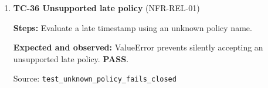 \begin{enumerate}
\begin{minipage}[t]{\linewidth}
\textbf{Expected and observed:} Rejected. \textbf{PASS}.\par

{\footnotesize Source: \nolinkurl{test_grace_policy_rejects_after_grace_boundary}}\end{minipage}

\item \begin{minipage}[t]{\linewidth}\textbf{TC-36 Unsupported late policy } (NFR-REL-01)\par

\textbf{Steps:} Evaluate a late timestamp using an unknown policy name.\par

\textbf{Expected and observed:} ValueError prevents silently accepting an unsupported late policy. \textbf{PASS}.\par

{\footnotesize Source: \nolinkurl{test_unknown_policy_fails_closed}}\end{minipage}

\end{enumerate}

\endgroup
